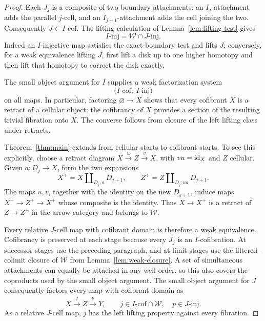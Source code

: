 \begin{proof}
Each \(J_j\) is a composite of two boundary attachments: an
\(I_j\)-attachment adds the parallel \(j\)-cell, and an
\(I_{j+1}\)-attachment adds the cell joining the two.  Consequently
\(J\subset I\text{-}\mathrm{cof}\).  The lifting calculation of
Lemma~\ref{lem:lifting-test} gives
\begin{equation}\label{eq:consequences-trivial-fibrations}
 I\text{-}\mathrm{inj}
   =\mathcal W\cap J\text{-}\mathrm{inj}.
\end{equation}
Indeed an \(I\)-injective map satisfies the exact-boundary test and
lifts \(J\); conversely, for a weak equivalence lifting \(J\), first
lift a disk up to one higher homotopy and then lift that homotopy to
correct the disk exactly.

The small object argument for \(I\) supplies a weak factorization
system
\[
 \bigl(I\text{-}\mathrm{cof},\ I\text{-}\mathrm{inj}\bigr)
\]
on all maps.  In particular, factoring \(\varnothing\to X\) shows
that every cofibrant \(X\) is a retract of a cellular object: the
cofibrancy of \(X\) provides a section of the resulting trivial
fibration onto \(X\).  The converse follows from closure of the left
lifting class under retracts.

Theorem~\ref{thm:main} extends from cellular starts to cofibrant starts.
To see this explicitly, choose a retract diagram
\(X\xrightarrow{u}Z\xrightarrow{v}X\), with \(vu=\mathrm{id}_X\) and
\(Z\) cellular.  Given \(a:D_j\to X\), form the two expansions
\[
 X^+=X\amalg_{D_j,a}D_{j+1},
 \qquad
 Z^+=Z\amalg_{D_j,ua}D_{j+1}.
\]
The maps \(u,v\), together with the identity on the new
\(D_{j+1}\), induce maps \(X^+\to Z^+\to X^+\) whose composite
is the identity.  Thus \(X\to X^+\) is a retract of \(Z\to Z^+\)
in the arrow category and belongs to \(\mathcal W\).

Every relative \(J\)-cell map with cofibrant domain is therefore a
weak equivalence.  Cofibrancy is preserved at each stage because every
\(J_j\) is an \(I\)-cofibration.  At successor stages use the
preceding paragraph, and at limit stages use the filtered-colimit
closure of \(\mathcal W\) from Lemma~\ref{lem:weak-closure}.
A set of simultaneous attachments can equally be attached in any
well-order, so this also covers the coproducts used by the small object
argument.  The small object argument for \(J\) consequently factors
every map with cofibrant domain as
\[
 X\xrightarrow{j}Z\xrightarrow{p}Y,
 \qquad
 j\in I\text{-}\mathrm{cof}\cap\mathcal W,
 \quad p\in J\text{-}\mathrm{inj}.
\]
As a relative \(J\)-cell map, \(j\) has the left lifting property
against every fibration.


\end{proof}
